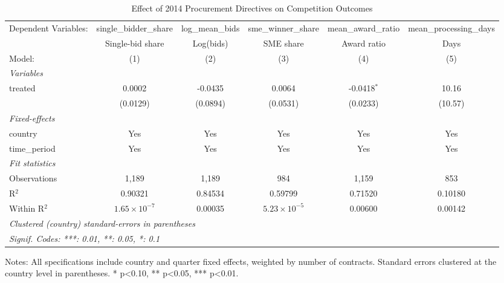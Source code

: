 
\begin{table}[htbp]
   \caption{\label{tab:main_results} Effect of 2014 Procurement Directives on Competition Outcomes}
   \centering
   \begin{adjustbox}{max width=\textwidth}
   \begin{tabular}{lccccc}
      \tabularnewline \midrule \midrule
      Dependent Variables: & single\_bidder\_share   & log\_mean\_bids   & sme\_winner\_share    & mean\_award\_ratio   & mean\_processing\_days\\    
                           & Single-bid share        & Log(bids)         & SME share             & Award ratio          & Days \\   
      Model:               & (1)                     & (2)               & (3)                   & (4)                  & (5)\\  
      \midrule
      \emph{Variables}\\
      treated              & 0.0002                  & -0.0435           & 0.0064                & -0.0418$^{*}$        & 10.16\\   
                           & (0.0129)                & (0.0894)          & (0.0531)              & (0.0233)             & (10.57)\\   
      \midrule
      \emph{Fixed-effects}\\
      country              & Yes                     & Yes               & Yes                   & Yes                  & Yes\\  
      time\_period         & Yes                     & Yes               & Yes                   & Yes                  & Yes\\  
      \midrule
      \emph{Fit statistics}\\
      Observations         & 1,189                   & 1,189             & 984                   & 1,159                & 853\\  
      R$^2$                & 0.90321                 & 0.84534           & 0.59799               & 0.71520              & 0.10180\\  
      Within R$^2$         & $1.65\times 10^{-7}$    & 0.00035           & $5.23\times 10^{-5}$  & 0.00600              & 0.00142\\  
      \midrule \midrule
      \multicolumn{6}{l}{\emph{Clustered (country) standard-errors in parentheses}}\\
      \multicolumn{6}{l}{\emph{Signif. Codes: ***: 0.01, **: 0.05, *: 0.1}}\\
   \end{tabular}
   \end{adjustbox}
   
   \par \raggedright 
   Notes: All specifications include country and quarter fixed effects, weighted by number of contracts. Standard errors clustered at the country level in parentheses. * p<0.10, ** p<0.05, *** p<0.01.
\end{table}


